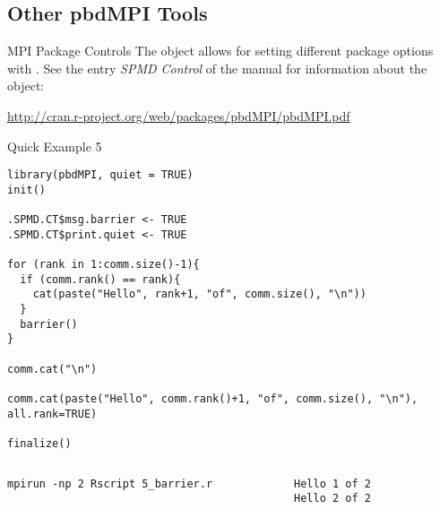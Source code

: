 \subsection{Other pbdMPI Tools}
\makesubcontentsslidessec


\begin{frame}
  \begin{block}{MPI Package Controls}
The  object allows for setting different package options with .  See the 
entry \emph{SPMD Control} of the  manual for information about the  
object:
\begin{center}
{ \small
\url{http://cran.r-project.org/web/packages/pbdMPI/pbdMPI.pdf}
}
\end{center}
  \end{block}
\end{frame}

\begin{frame}
  \begin{exampleblock}{Quick Example 5}
\begin{lstlisting}[title=Barrier: 5\_barrier.r]
library(pbdMPI, quiet = TRUE)
init()

.SPMD.CT$msg.barrier <- TRUE
.SPMD.CT$print.quiet <- TRUE

for (rank in 1:comm.size()-1){
  if (comm.rank() == rank){
    cat(paste("Hello", rank+1, "of", comm.size(), "\n"))
  }
  barrier()
}

comm.cat("\n")

comm.cat(paste("Hello", comm.rank()+1, "of", comm.size(), "\n"), all.rank=TRUE)

finalize()
\end{lstlisting}
  \begin{columns}[t,onlytextwidth]
    \begin{column}{0.58\textwidth}
\begin{lstlisting}[backgroundcolor=\color{white},keywordstyle=\color{black},title=Execute this 
script via:]
mpirun -np 2 Rscript 5_barrier.r
\end{lstlisting}
    \end{column}
    \hfill
    \begin{column}{0.4\textwidth}
\begin{lstlisting}[title=Sample Output:]
Hello 1 of 2 
Hello 2 of 2 
\end{lstlisting}
    \end{column}
​  \end{columns}
  \end{exampleblock}
\end{frame}


